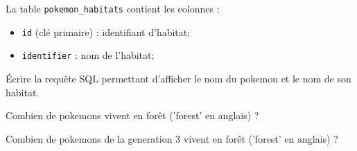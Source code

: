 La table \texttt{pokemon\_habitats} contient les colonnes :

\begin{itemize}[itemsep=0mm]
	\item \texttt{id} (clé primaire) : identifiant d'habitat;
	\item \texttt{identifier} : nom de l'habitat;
\end{itemize}

\question{}
\'Ecrire la requête SQL permettant d'afficher le nom du pokemon et le nom de son habitat.

\question{}
Combien de pokemons vivent en forêt ('forest' en anglais) ?

\question{}
Combien de pokemons de la generation 3 vivent en forêt ('forest' en anglais) ?


%
%
%
%
%
%
%
%
%
%

